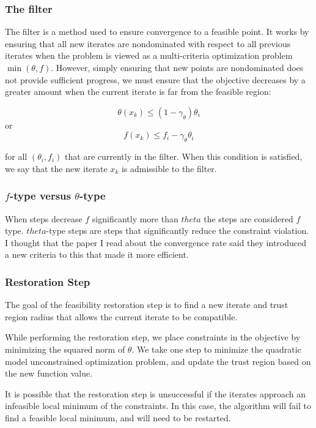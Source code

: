 \documentclass{article}
\begin{document}
\subsubsection{The filter}

The filter is a method used to ensure convergence to a feasible point.
It works by ensuring that all new iterates are nondominated with respect to all previous iterates when the problem is viewed as a multi-criteria optimization problem $\min (\theta, f)$. However, simply ensuring that new points are nondominated does not provide sufficient progress, we must ensure that the objective decreases by a greater amount when the current iterate is far from the feasible region:

\[
\theta(x_k) \le (1-\gamma_{\theta})\theta_i
\]
or
\[
f(x_k) \le f_i -\gamma_{\theta}\theta_i
\]

for all $(\theta_i, f_i)$ that are currently in the filter.
When this condition is satisfied, we say that the new iterate $x_k$ is admissible to the filter.

\subsubsection{$f$-type versus $\theta$-type}

When steps decrease $f$ significantly more than $theta$ the steps are considered $f$ type.
$theta$-type steps are steps that significantly reduce the constraint violation.
I thought that the paper I read about the convergence rate said they introduced a new criteria to this that made it more efficient.

\subsubsection{Restoration Step}

The goal of the feasibility restoration step is to find a new iterate and trust region radius that allows the current iterate to be compatible.

While performing the restoration step, we place constraints in the objective by minimizing the squared norm of $\theta$.
We take one step to minimize the quadratic model unconstrained optimization problem, and update the trust region based on the new function value.

It is possible that the restoration step is unsuccessful if the iterates approach an infeasible local minimum of the constraints.
In this case, the algorithm will fail to find a feasible local minimum, and will need to be restarted.
\end{document}
